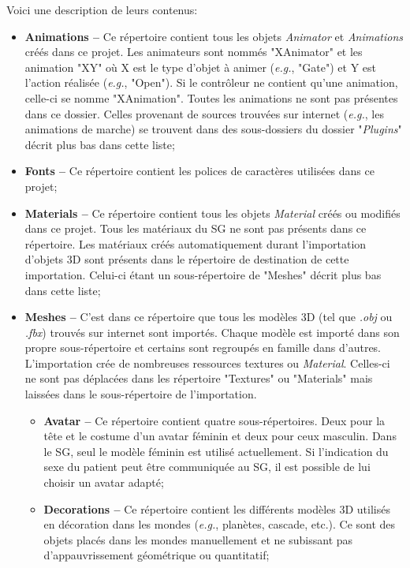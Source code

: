		Voici une description de leurs contenus:
		\begin{itemize}
			\item \textbf{Animations --} Ce répertoire contient tous les objets \textit{Animator} et \textit{Animations} créés dans ce projet. Les animateurs sont nommés "XAnimator" et les animation "XY" où X est le type d'objet à animer (\textit{e.g.}, "Gate") et Y est l'action réalisée (\textit{e.g.}, "Open"). Si le contrôleur ne contient qu'une animation, celle-ci se nomme "XAnimation". Toutes les animations ne sont pas présentes dans ce dossier. Celles provenant de sources trouvées sur internet (\textit{e.g.}, les animations de marche) se trouvent dans des sous-dossiers du dossier "\textit{Plugins}" décrit plus bas dans cette liste;
			\item \textbf{ Fonts --} Ce répertoire contient les polices de caractères utilisées dans ce projet;
			\item \textbf{ Materials --} Ce répertoire contient tous les objets \textit{Material} créés ou modifiés dans ce projet. Tous les matériaux du SG ne sont pas présents dans ce répertoire. Les matériaux créés automatiquement durant l'importation d'objets 3D sont présents dans le répertoire de destination de cette importation. Celui-ci étant un sous-répertoire de "Meshes" décrit plus bas dans cette liste; 
			\item \textbf{Meshes --} C'est dans ce répertoire que tous les modèles 3D (tel que \textit{.obj} ou \textit{.fbx}) trouvés sur internet sont importés. Chaque modèle est importé dans son propre sous-répertoire et certains sont regroupés en famille dans d'autres. L'importation crée de nombreuses ressources textures ou \textit{Material}. Celles-ci ne sont pas déplacées dans les répertoire "Textures" ou "Materials" mais laissées dans le sous-répertoire de l'importation.
			\begin{itemize}
				\item \textbf{Avatar --} Ce répertoire contient quatre sous-répertoires. Deux pour la tête et le costume d'un avatar féminin et deux pour ceux masculin. Dans le SG, seul le modèle féminin est utilisé actuellement. Si l'indication du sexe du patient peut être communiquée au SG, il est possible de lui choisir un avatar adapté;
				\item \textbf{Decorations --} Ce répertoire contient les différents modèles 3D utilisés en décoration dans les mondes (\textit{e.g.}, planètes, cascade, etc.). Ce sont des objets placés dans les mondes manuellement et ne subissant pas d'appauvrissement géométrique ou quantitatif;

\end{itemize}
\end{itemize}
